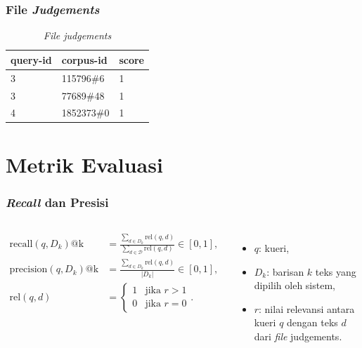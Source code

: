 \documentclass[10pt]{beamer}
\newcommand{\f}[1]{\textit{#1}}
\begin{document}
\begin{frame}
\frametitle{File \f{Judgements}}

    \begin{table}[!ht]
        \centering
        \caption{\f{File judgements}}
        \label{tab:judgements-file-example}
        \begin{tabular}{|l|l|l|}
            \hline
            \textbf{query-id} & \textbf{corpus-id} & \textbf{score} \\ \hline
            3                 & 115796\#6          & 1              \\ \hline
            3                 & 77689\#48          & 1              \\ \hline
            4                 & 1852373\#0         & 1              \\ \hline
        \end{tabular}
    \end{table}
\end{frame}

\section{Metrik Evaluasi}

\begin{frame}
    \frametitle{\f{Recall} dan Presisi}

    \begin{columns}
        \begin{align*}
            \text{recall}(q, D_k)\text{@k} &= \frac{\sum_{d \in D_k} \text{rel}(q, d)}{\sum_{d \in \mathcal{D}} \text{rel}(q, d)} \in [0, 1], \\ 
            \text{precision}(q, D_k)\text{@k} &= \frac{\sum_{d \in D_k} \text{rel}(q, d)}{|D_k|} \in [0, 1], \\
            \text{rel}(q, d) &= \begin{cases} 
            1 & \text{jika } r > 1 \\
            0 & \text{jika } r = 0
            \end{cases}.
        \end{align*}

        \begin{itemize}
            \item $q$: kueri,
            \item $D_k$: barisan $k$ teks yang dipilih oleh sistem,
            \item $r$: nilai relevansi antara kueri $q$ dengan teks $d$ dari \f{file} judgements.
        \end{itemize}
    \end{columns}
\end{frame}
\end{document}
